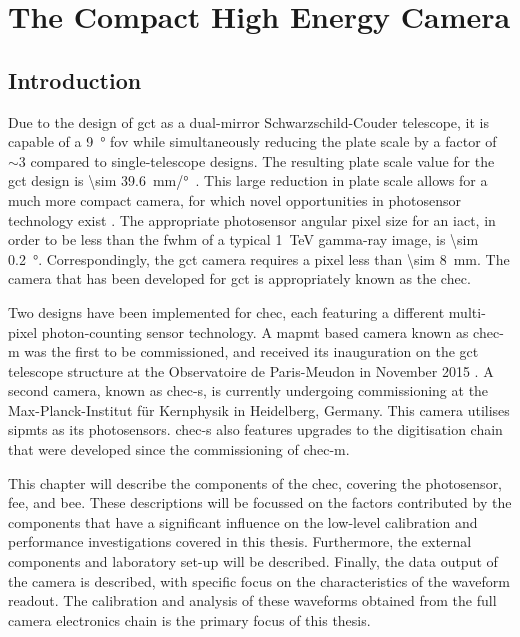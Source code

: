 \chapter{\label{ch2-mechanics} The Compact High Energy Camera}

\minitoc

\section{Introduction}

Due to the design of \gls{gct} as a dual-mirror Schwarzschild-Couder telescope, it is capable of a \SI{9}{\degree} \gls{fov} while simultaneously reducing the plate scale by a factor of ${\sim} 3$ compared to single-telescope designs. The resulting plate scale value for the \gls{gct} design is \SI{\sim 39.6}{mm/\degree}~\cite{Rulten2016}. This large reduction in plate scale allows for a much more compact camera, for which novel opportunities in photosensor technology exist \cite{Vassiliev2007}. The appropriate photosensor angular pixel size for an \mbox{\gls{iact}}, in order to be less than the \gls{fwhm} of a typical \SI{1}{TeV} gamma-ray image, is \SI{\sim 0.2}{\degree}. Correspondingly, the \gls{gct} camera requires a pixel less than \SI{\sim 8}{mm}. The camera that has been developed for \gls{gct} is appropriately known as the \gls{chec}.

Two designs have been implemented for \gls{chec}, each featuring a different multi-pixel photon-counting sensor technology. A \gls{mapmt} based camera known as \gls{chec-m} was the first to be commissioned, and received its inauguration on the \gls{gct} telescope structure at the Observatoire de Paris-Meudon in November 2015 \cite{Watson2017}. A second camera, known as \gls{chec-s}, is currently undergoing commissioning at the Max-Planck-Institut für Kernphysik in Heidelberg, Germany. This camera utilises \glspl{sipmt} as its photosensors. \gls{chec-s} also features upgrades to the digitisation chain that were developed since the commissioning of \gls{chec-m}.

This chapter will describe the components of the \gls{chec}, covering the photosensor, \gls{fee}, and \gls{bee}. These descriptions will be focussed on the factors contributed by the components that have a significant influence on the low-level calibration and performance investigations covered in this thesis. Furthermore, the external components and laboratory set-up will be described. Finally, the data output of the camera is described, with specific focus on the characteristics of the waveform readout. The calibration and analysis of these waveforms obtained from the full camera electronics chain is the primary focus of this thesis.

